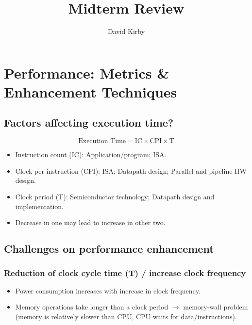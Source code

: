 \documentclass[11pt]{article}
\begin{document}
\setmonofont{SF Mono}

\title{Midterm Review}
\author{David Kirby}
\maketitle
\tableofcontents

\newpage
\section{Performance: Metrics \& Enhancement Techniques}

\subsection{Factors affecting execution time?}
\begin{equation}
    \text{Execution Time} = \text{IC} \times \text{CPI} \times \text{T}
\end{equation}
\begin{itemize}
    \item Instruction count (IC): Application/program; ISA.
    \item Clock per instruction (CPI): ISA; Datapath design; Parallel and pipeline HW design.
    \item Clock period (T): Semiconductor technology; Datapath design and
    implementation.
    \item Decrease in one may lead to increase in other two.
\end{itemize}

\subsection{Challenges on performance enhancement}


\subsubsection{Reduction of clock cycle time (T) / increase clock frequency}
    \begin{itemize}
        \item Power consumption increases with increase in clock frequency.
        \item Memory operations take longer than a clock period \(\rightarrow\) memory-wall problem (memory is relatively slower than CPU, CPU waits for data/instructions).
    \end{itemize}
\end{document}
